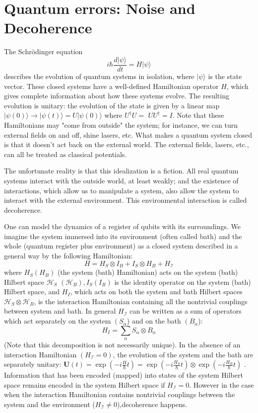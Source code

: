 \section{Quantum errors: Noise and Decoherence}
The Schrödinger equation
$$
i \hbar \frac{d|\psi\rangle}{d t}=H|\psi\rangle
$$
describes the evolution of quantum systems in isolation, where $|\psi\rangle$ is the state vector. These closed systems have a well-defined Hamiltonian operator $H$, which gives complete information about how these systems evolve. The resulting evolution is unitary: the evolution of the state is given by a linear map $|\psi(0)\rangle \rightarrow|\psi(t)\rangle=U|\psi(0)\rangle$ where $U^{\dagger} U=$ $U U^{\dagger}=I$. Note that these Hamiltonians may "come from outside" the system; for instance, we can turn external fields on and off, shine lasers, etc. What makes a quantum system closed is that it doesn't act back on the external world. The external fields, lasers, etc., can all be treated as classical potentials.

The unfortunate reality is that this idealization is a fiction. All real quantum systems interact with the outside world, at least weakly; and the existence of interactions, which allow us to manipulate a system, also allow the system to interact with the external environment. This environmental interaction is called decoherence.

One can model the dynamics of a register of qubits with its surroundings. We imagine the system immersed into its environment (often called bath) and the whole (quantum register plus environment) as a closed system described in a general way by the following Hamiltonian:
$$
H=H_{S} \otimes I_{B}+I_{S} \otimes H_{B}+H_{\mathcal{I}}
$$
where $H_{S}\left(H_{B}\right)$ (the system (bath) Hamiltonian) acts on the system (bath) Hilbert space $\mathcal{H}_{S}$ $\left(\mathcal{H}_{B}\right), I_{S}\left(I_{B}\right)$ is the identity operator on the system (bath) Hilbert space, and $H_{I}$, which acts on both the system and bath Hilbert spaces $\mathcal{H}_{S} \otimes \mathcal{H}_{B}$, is the interaction Hamiltonian containing all the nontrivial couplings between system and bath. In general $H_{\mathcal{I}}$ can be written as a sum of operators which act separately on the system $\left(S_{\alpha}\right.$) and on the bath $\left(B_{\alpha}\right.$):
$$
H_{I}=\sum_{\alpha} S_{\alpha} \otimes B_{\alpha}
$$
(Note that this decomposition is not necessarily unique). In the absence of an interaction Hamiltonian $\left(H_{\mathcal{I}}=0\right)$, the evolution of the system and the bath are separately unitary: $\mathbf{U}(t)=\exp (-i \frac{H}{\hbar} t)=\exp \left(-i \frac{H_{S}}{\hbar} t\right) \otimes \exp \left(-i \frac{H_{B}}{\hbar} t\right)$ . Information that has been encoded (mapped) into states of the system Hilbert space remains encoded in the system Hilbert space if $H_{\mathcal{I}}=0$.
 However in the case when the interaction Hamiltonian contains nontrivial couplings between the system and the environment ($H_{\mathcal{I}}\neq 0$),decoherence happens. %

